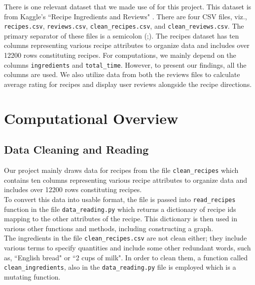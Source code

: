 \documentclass[fontsize=11pt]{article}
\begin{document}
    There is one relevant dataset that we made use of for this project. This dataset is from Kaggle's ``Recipe Ingredients and Reviews" \cite{recipe_dataset}. There are four CSV files, viz., \texttt{recipes.csv}, \texttt{reviews.csv}, \texttt{clean\_recipes.csv}, and \texttt{clean\_reviews.csv}. The primary separator of these files is a semicolon (;). The recipes dataset has ten columns representing various recipe attributes to organize data and includes over 12200 rows constituting recipes. For computations, we mainly depend on the columns \texttt{ingredients} and \texttt{total\_time}. However, to present our findings, all the columns are used. We also utilize data from both the reviews files to calculate average rating for recipes and display user reviews alongside the recipe directions.


    \section*{Computational Overview}

    \subsection*{Data Cleaning and Reading}

    Our project mainly draws data for recipes from the file \texttt{clean\_recipes} which contains ten columns representing various recipe attributes to organize data and includes over 12200 rows constituting recipes. \\

    To convert this data into usable format, the file is passed into \texttt{read\_recipes} function in the file \texttt{data\_reading.py} which returns a dictionary of recipe ids mapping to the other attributes of the recipe. This dictionary is then used in various other functions and methods, including constructing a graph. \\

    The ingredients in the file \texttt{clean\_recipes.csv} are not clean either; they include various terms to specify quantities and include some other redundant words, such as, ``English bread" or ``2 cups of milk". In order to clean them, a function called \texttt{clean\_ingredients}, also in the \texttt{data\_reading.py} file is employed which is a mutating function.  \\
\end{document}
